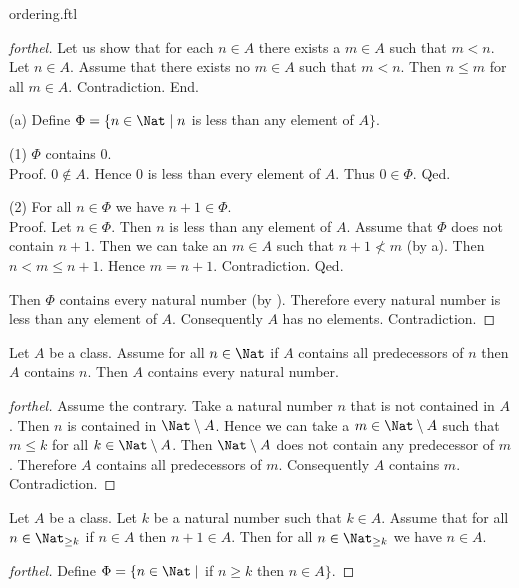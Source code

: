 \documentclass{naproche-library}
\begin{document}
\begin{smodule}{ordering.ftl}
\begin{proof}[forthel]
    Let us show that for each $n \in A$ there exists a $m \in A$ such that $m < n$.
      Let $n \in A$.
      Assume that there exists no $m \in A$ such that $m < n$.
      Then $n \leq m$ for all $m \in A$.
      Contradiction.
    End.

    (a) Define $\Phi = \{ n \in \Nat \mid n$ is less than any element of $A \}$.

    (1) $\Phi$ contains $0$. \\
    Proof.
      $0 \notin A$.
      Hence $0$ is less than every element of $A$.
      Thus $0 \in \Phi$.
    Qed.

    (2) For all $n \in \Phi$ we have $n + 1 \in \Phi$. \\
    Proof.
      Let $n \in \Phi$.
      Then $n$ is less than any element of $A$.
      Assume that $\Phi$ does not contain $n + 1$.
      Then we can take an $m \in A$ such that $n + 1 \nless m$ (by a).
      Then $n < m \leq n + 1$.
      Hence $m = n + 1$.
      Contradiction.
    Qed.

    Then $\Phi$ contains every natural number (by ).
    Therefore every natural number is less than any element of $A$.
    Consequently $A$ has no elements.
    Contradiction.
  \end{proof}

  \begin{theorem}[forthel,id=ARITHMETIC_04_3609801697263616]
    Let $A$ be a class.
    Assume for all $n \in \Nat$ if $A$ contains all predecessors of $n$ then $A$ contains $n$.
    Then $A$ contains every natural number.
  \end{theorem}
  \begin{proof}[forthel]
    Assume the contrary.
    Take a natural number $n$ that is not contained in $A$.
    Then $n$ is contained in $\Nat \setminus A$.
    Hence we can take a $m \in \Nat \setminus A$ such that $m \leq k$ for all $k \in \Nat \setminus A$.
    Then $\Nat \setminus A$ does not contain any predecessor of $m$.
    Therefore $A$ contains all predecessors of $m$.
    Consequently $A$ contains $m$.
    Contradiction.
  \end{proof}

  \begin{theorem}[forthel,id=ARITHMETIC_04_4976599269113856]
    Let $A$ be a class.
    Let $k$ be a natural number such that $k \in A$.
    Assume that for all $n \in \Nat_{\geq k}$ if $n \in A$ then $n + 1 \in A$.
    Then for all $n \in \Nat_{\geq k}$ we have $n \in A$.
  \end{theorem}
  \begin{proof}[forthel]
    Define $\Phi = \{n \in \Nat \mid$ if $n \geq k$ then $n \in A \}$.


\end{proof}
\end{smodule}
\end{document}
